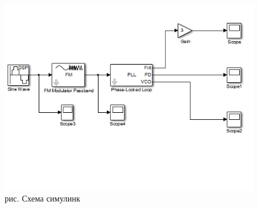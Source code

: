 \documentclass[10pt,a4paper]{report}
\begin{document}
\begin{figure}
\begin{center}
\includegraphics[width=150mm, scale = 0.7]{8_13}\newline
рис. Схема симулинк\newline
\end{center}
\end{figure}

\clearpage
\end{document}
